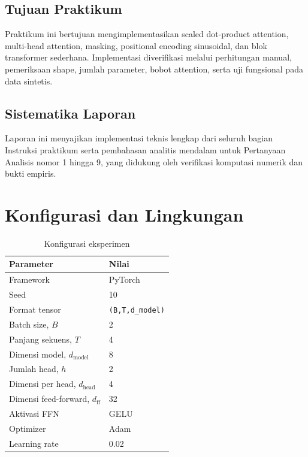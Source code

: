 \documentclass[12pt,a4paper]{article}
\newcommand{\code}[1]{\texttt{\small #1}}
\begin{document}
\subsection{Tujuan Praktikum}
Praktikum ini bertujuan mengimplementasikan scaled dot-product attention,
multi-head attention, masking, positional encoding sinusoidal, dan blok
transformer sederhana. Implementasi diverifikasi melalui perhitungan manual,
pemeriksaan shape, jumlah parameter, bobot attention, serta uji fungsional pada
data sintetis.

\subsection{Sistematika Laporan}
Laporan ini menyajikan implementasi teknis lengkap dari seluruh bagian Instruksi praktikum serta pembahasan analitis mendalam untuk Pertanyaan Analisis nomor 1 hingga 9, yang didukung oleh verifikasi komputasi numerik dan bukti empiris.

\section{Konfigurasi dan Lingkungan}

\begin{table}[H]
    \centering
    \caption{Konfigurasi eksperimen}
    \label{tab:configuration}
    \renewcommand{\arraystretch}{1.2}
    \begin{tabular}{l l}
        \toprule
        Parameter & Nilai \\
        \midrule
        Framework & PyTorch \\
        Seed & 10 \\
        Format tensor & \code{(B,T,d\_model)} \\
        Batch size, $B$ & 2 \\
        Panjang sekuens, $T$ & 4 \\
        Dimensi model, $d_{\text{model}}$ & 8 \\
        Jumlah head, $h$ & 2 \\
        Dimensi per head, $d_{\text{head}}$ & 4 \\
        Dimensi feed-forward, $d_{\text{ff}}$ & 32 \\
        Aktivasi FFN & GELU \\
        Optimizer & Adam \\
        Learning rate & 0.02 \\
        \bottomrule
    \end{tabular}
\end{table}
\end{document}
